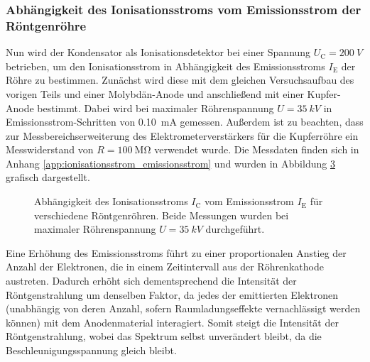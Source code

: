 \documentclass[11pt, a4paper]{article}
\numberwithin{equation}{section}
\begin{document}
\subsubsection{Abhängigkeit des Ionisationsstroms vom Emissionsstrom der Röntgenröhre}
\label{sec:abh_emissionsstrom}
Nun wird der Kondensator als Ionisationsdetektor bei einer Spannung $U_\mathrm{C} = \SI{200}{V}$ betrieben, um den Ionisationsstrom in Abhängigkeit des Emissionsstroms $I_\mathrm{E}$ der Röhre zu bestimmen.
Zunächst wird diese mit dem gleichen Versuchsaufbau des vorigen Teils und einer Molybdän-Anode und anschließend mit einer Kupfer-Anode bestimmt.
Dabei wird bei maximaler Röhrenspannung $U = \SI{35}{kV}$ in Emissionsstrom-Schritten von \SI{0.10}{mA} gemessen.
Außerdem ist zu beachten, dass zur Messbereichserweiterung des Elektrometerverstärkers für die Kupferröhre ein Messwiderstand von $R=\SI{100}{\mega\ohm}$ verwendet wurde.
Die Messdaten finden sich in Anhang \ref{app:ionisationsstrom_emissionsstrom} und wurden in Abbildung \ref{fig:abh_emissionsstrom} grafisch dargestellt.
\begin{figure}[hp]
	\centering
	\begin{subfigure}[b]{1\textwidth}
		
		\label{fig:mo_emissionsstrom}
	\end{subfigure}
	
	\vspace{10mm}
	
	\begin{subfigure}[b]{1\textwidth}
		
		\label{fig:cu_emissionsstrom}
	\end{subfigure}
	\caption{Abhängigkeit des Ionisationsstroms $I_\mathrm{C}$ vom Emissionsstrom $I_\mathrm{E}$ für verschiedene Röntgenröhren. Beide Messungen wurden bei maximaler Röhrenspannung $U=\SI{35}{kV}$ durchgeführt.}
	\label{fig:abh_emissionsstrom}
\end{figure}
Eine Erhöhung des Emissionsstroms führt zu einer proportionalen Anstieg der Anzahl der Elektronen, die in einem Zeitintervall aus der Röhrenkathode austreten.
Dadurch erhöht sich dementsprechend die Intensität der Röntgenstrahlung um denselben Faktor, da jedes der emittierten Elektronen (unabhängig von deren Anzahl, sofern Raumladungseffekte vernachlässigt werden können) mit dem Anodenmaterial interagiert.
Somit steigt die Intensität der Röntgenstrahlung, wobei das Spektrum selbst unverändert bleibt, da die Beschleunigungsspannung gleich bleibt.
\end{document}
